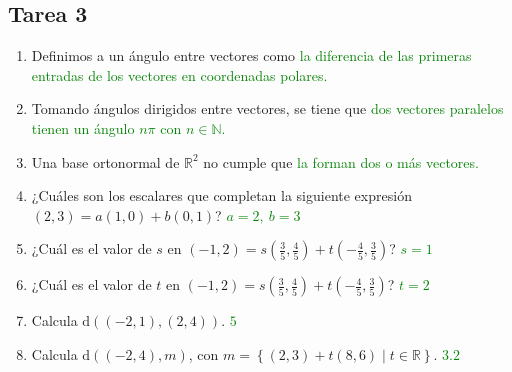 \documentclass{article}
\theoremstyle{definicion}
\theoremstyle{definition}             %
\theoremstyle{definition}             %
\theoremstyle{definition}
\theoremstyle{definition}
\theoremstyle{observacion}
\theoremstyle{definition}
\theoremstyle{plain}
\theoremstyle{definition}
\theoremstyle{afirmacion}
\theoremstyle{notation}
\theoremstyle{definition}
\begin{document}
        \subsection{Tarea 3}

        \begin{enumerate}[label = Preg. \arabic*.]
            \item Definimos a un ángulo entre vectores como \textcolor{green}{la diferencia de las primeras entradas de los vectores en coordenadas polares.}
            \item Tomando ángulos dirigidos entre vectores, se tiene que \textcolor{green}{dos vectores paralelos tienen un ángulo \(n\pi\) con \(n \in \mathbb{N}\).}
            \item Una base ortonormal de \(\mathbb{R}^{2}\) no cumple que \textcolor{green}{la forman dos o más vectores.}
            \item ¿Cuáles son los escalares que completan la siguiente expresión \((2, 3) = a(1, 0) + b(0, 1)\)? \textcolor{green}{\(a = 2,\ b = 3\)}
            \item ¿Cuál es el valor de \(s\) en \((-1, 2) = s(\frac{3}{5}, \frac{4}{5}) + t(-\frac{4}{5}, \frac{3}{5})\)? \textcolor{green}{\(s = 1\)}
            \item ¿Cuál es el valor de \(t\) en \((-1, 2) = s(\frac{3}{5}, \frac{4}{5}) + t(-\frac{4}{5}, \frac{3}{5})\)? \textcolor{green}{\(t = 2\)}
            \item Calcula \(\textrm{d}((-2, 1), (2, 4))\). \textcolor{green}{\(5\)}
            \item Calcula \(\textrm{d}((-2, 4), m)\), con \(m = \left\lbrace(2, 3) + t(8, 6) \mid t \in \mathbb{R}\right\rbrace\). \textcolor{green}{\(3.2\)}
        \end{enumerate}
\end{document}

